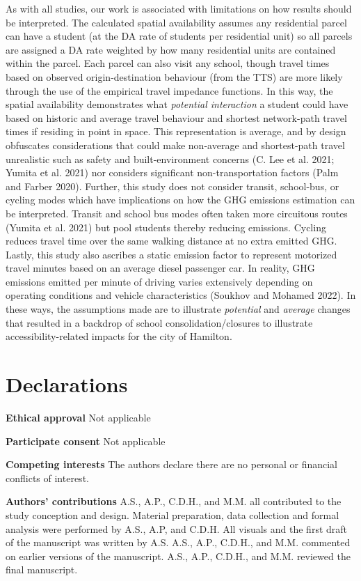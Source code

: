 \documentclass[
default
]{sn-jnl}
\begin{document}
As with all studies, our work is associated with limitations on how
results should be interpreted. The calculated spatial availability
assumes any residential parcel can have a student (at the DA rate of
students per residential unit) so all parcels are assigned a DA rate
weighted by how many residential units are contained within the parcel.
Each parcel can also visit any school, though travel times based on
observed origin-destination behaviour (from the TTS) are more likely
through the use of the empirical travel impedance functions. In this
way, the spatial availability demonstrates what \emph{potential
interaction} a student could have based on historic and average travel
behaviour and shortest network-path travel times if residing in point in
space. This representation is average, and by design obfuscates
considerations that could make non-average and shortest-path travel
unrealistic such as safety and built-environment concerns (C. Lee et al.
2021; Yumita et al. 2021) nor considers significant non-transportation
factors (Palm and Farber 2020). Further, this study does not consider
transit, school-bus, or cycling modes which have implications on how the
GHG emissions estimation can be interpreted. Transit and school bus
modes often taken more circuitous routes (Yumita et al. 2021) but pool
students thereby reducing emissions. Cycling reduces travel time over
the same walking distance at no extra emitted GHG. Lastly, this study
also ascribes a static emission factor to represent motorized travel
minutes based on an average diesel passenger car. In reality, GHG
emissions emitted per minute of driving varies extensively depending on
operating conditions and vehicle characteristics (Soukhov and Mohamed
2022). In these ways, the assumptions made are to illustrate
\emph{potential} and \emph{average} changes that resulted in a backdrop
of school consolidation/closures to illustrate accessibility-related
impacts for the city of Hamilton.

\section{Declarations}\label{declarations}

\textbf{Ethical approval} Not applicable

\textbf{Participate consent} Not applicable

\textbf{Competing interests} The authors declare there are no personal
or financial conflicts of interest.

\textbf{Authors' contributions} A.S., A.P., C.D.H., and M.M. all
contributed to the study conception and design. Material preparation,
data collection and formal analysis were performed by A.S., A.P, and
C.D.H. All visuals and the first draft of the manuscript was written by
A.S. A.S., A.P., C.D.H., and M.M. commented on earlier versions of the
manuscript. A.S., A.P., C.D.H., and M.M. reviewed the final manuscript.
\end{document}
